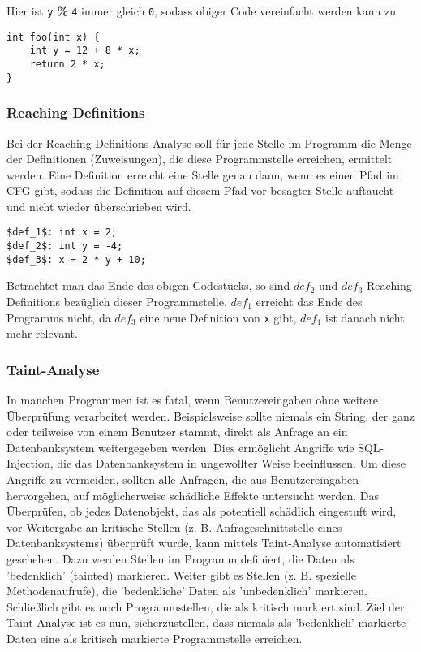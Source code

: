 Hier ist \lstinline|y| \textbf{\%} \lstinline|4| immer gleich \lstinline{0}, sodass obiger Code vereinfacht werden kann zu

\par

\begin{lstlisting}[frame=single, captionpos=b, caption=Mittels Constant-Bits-Analyse optimierte Version von Listing 4]
int foo(int x) {
	int y = 12 + 8 * x;
	return 2 * x;
} 
\end{lstlisting}

\subsubsection{Reaching Definitions}
Bei der Reaching-Definitions-Analyse soll für jede Stelle im Programm die Menge der Definitionen (Zuweisungen), die diese Programmstelle erreichen, ermittelt werden.
Eine Definition erreicht eine Stelle genau dann, wenn es einen Pfad im CFG gibt, sodass die Definition auf diesem Pfad vor besagter Stelle auftaucht und nicht wieder überschrieben wird.

\par

\begin{lstlisting}[frame=single, captionpos=b, caption=Beispielcode für Reaching-Definitions-Analyse]
$def_1$: int x = 2;
$def_2$: int y = -4;
$def_3$: x = 2 * y + 10; 
\end{lstlisting}

\par

Betrachtet man das Ende des obigen Codestücks, so sind $def_2$ und $def_3$ Reaching Definitions bezüglich dieser Programmstelle.
$def_1$ erreicht das Ende des Programms nicht, da $def_3$ eine neue Definition von \lstinline{x} gibt, $def_1$ ist danach nicht mehr relevant.

\subsubsection{Taint-Analyse}
In manchen Programmen ist es fatal, wenn Benutzereingaben ohne weitere Überprüfung verarbeitet werden. 
Beispielsweise sollte niemals ein String, der ganz oder teilweise von einem Benutzer stammt, direkt als Anfrage an ein Datenbanksystem weitergegeben werden.
Dies ermöglicht Angriffe wie SQL-Injection, die das Datenbanksystem in ungewollter Weise beeinflussen.
Um diese Angriffe zu vermeiden, sollten alle Anfragen, die aus Benutzereingaben hervorgehen, auf möglicherweise schädliche Effekte untersucht werden.
Das Überprüfen, ob jedes Datenobjekt, das als potentiell schädlich eingestuft wird, vor Weitergabe an kritische Stellen (z. B. Anfrageschnittstelle eines Datenbanksystems) überprüft wurde, kann mittels Taint-Analyse automatisiert geschehen.
Dazu werden Stellen im Programm definiert, die Daten als 'bedenklich' (tainted) markieren.
Weiter gibt es Stellen (z. B. spezielle Methodenaufrufe), die 'bedenkliche' Daten als 'unbedenklich' markieren.
Schließlich gibt es noch Programmstellen, die als kritisch markiert sind.
Ziel der Taint-Analyse ist es nun, sicherzustellen, dass niemals als 'bedenklich' markierte Daten eine als kritisch markierte Programmstelle erreichen.

